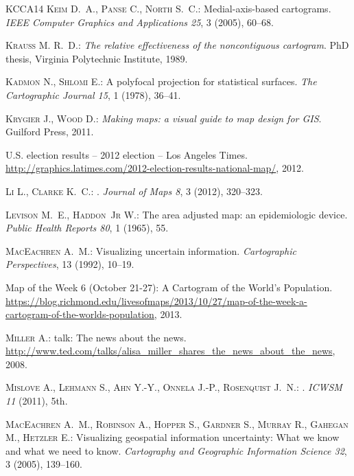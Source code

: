 \documentclass{egpubl}
\begin{document}
\begin{thebibliography}{\uppercase{KCCA{\etalchar{*}}14}}
\textsc{Keim D.~A., Panse C., North S.~C.}:
\newblock Medial-axis-based cartograms.
\newblock \emph{IEEE Computer Graphics and Applications 25}, 3 (2005), 60--68.

\textsc{Krauss M. R.~D.}:
\newblock \emph{The relative effectiveness of the noncontiguous cartogram}.
\newblock PhD thesis, Virginia Polytechnic Institute, 1989.

\textsc{Kadmon N., Shlomi E.}:
\newblock A polyfocal projection for statistical surfaces.
\newblock \emph{The Cartographic Journal 15}, 1 (1978), 36--41.

\textsc{Krygier J., Wood D.}:
\newblock \emph{Making maps: a visual guide to map design for GIS}.
\newblock Guilford Press, 2011.

{U.S.} election results -- 2012 election -- {Los Angeles Times}.
\newblock
  \url{http://graphics.latimes.com/2012-election-results-national-map/}, 2012.

\textsc{Li L., Clarke K.~C.}:
.
\newblock \emph{Journal of Maps 8}, 3 (2012), 320--323.

\textsc{Levison M.~E., Haddon~Jr W.}:
\newblock The area adjusted map: an epidemiologic device.
\newblock \emph{Public Health Reports 80}, 1 (1965), 55.

\textsc{MacEachren A.~M.}:
\newblock Visualizing uncertain information.
\newblock \emph{Cartographic Perspectives}, 13 (1992), 10--19.

{Map of the Week 6 (October 21-27): A Cartogram of the World's Population}.
\newblock
  \url{https://blog.richmond.edu/livesofmaps/2013/10/27/map-of-the-week-a-cartogram-of-the-worlds-population},
  2013.

\textsc{Miller A.}:
 talk: The news about the news.
\newblock
  \url{http://www.ted.com/talks/alisa_miller_shares_the_news_about_the_news},
  2008.

\textsc{Mislove A., Lehmann S., Ahn Y.-Y., Onnela J.-P., Rosenquist J.~N.}:
.
\newblock \emph{ICWSM 11} (2011), 5th.

\textsc{MacEachren A.~M., Robinson A., Hopper S., Gardner S., Murray R.,
  Gahegan M., Hetzler E.}:
\newblock Visualizing geospatial information uncertainty: What we know and what
  we need to know.
\newblock \emph{Cartography and Geographic Information Science 32}, 3 (2005),
  139--160.


\end{thebibliography}
\end{document}
